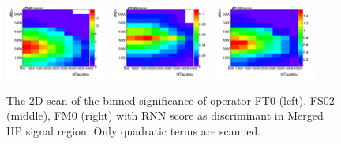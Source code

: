 \begin{figure}[ht]
    \centering
    \includegraphics[width=0.30\textwidth]{figures/aQGC/HPSRFT0RNN.pdf}
    \includegraphics[width=0.30\textwidth]{figures/aQGC/HPSRFS02RNN.pdf}
  \includegraphics[width=0.30\textwidth]{figures/aQGC/HPSRFM0RNN.pdf}
        \caption{The 2D scan of the binned significance of operator FT0 (left), FS02 (middle), FM0 (right) with RNN score as discriminant in Merged HP signal region. Only quadratic terms are scanned.}
        \label{fig:2lepaQGCBinnedSigRNN}
\end{figure}

